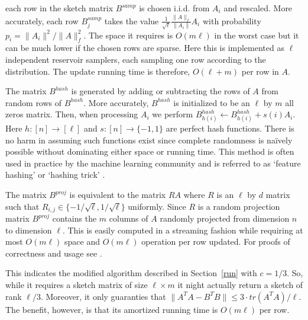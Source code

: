 \documentclass[]{article}
\newcommand{\FD}{Frequent-Directions}
\begin{document}
 each row in the sketch matrix $B^{samp}$ is chosen i.i.d. from $A_i$ and rescaled.
More accurately, each row $B^{samp}_j$ takes the value $\frac{1}{\sqrt{\ell}}\frac{\|A\|_f}{\|A_i\|}A_i$ with probability $p_i = \|A_i\|^2/\|A\|_f^2$.
The space it requires is $O(m \ell)$ in the worst case but it can be much lower if the chosen rows are sparse.
Here this is implemented as $\ell$ independent reservoir samplers, each sampling one row according to the distribution.
The update running time is therefore, $O(\ell + m)$ per row in $A$.

 The matrix $B^{hash}$ is generated by adding or subtracting the rows of $A$ from random rows of $B^{hash}$.
More accurately, $B^{hash}$ is initialized to be an $\ell$ by $m$ all zeros matrix. 
Then, when processing $A_i$ we perform $B^{hash}_{h(i)} \leftarrow B^{hash}_{h(i)} + s(i)A_i$.
Here $h:[n]\rightarrow [\ell]$ and $s:[n]\rightarrow \{-1,1\}$ are perfect hash functions. 
There is no harm in assuming such functions exist since complete randomness is na\"ively possible without dominating either space or running time.
This method is often used in practice by the machine learning community and is referred to as `feature hashing' or `hashing trick'  \cite{WeinbergerDLSA2009}.

The matrix $B^{proj}$ is equivalent to the matrix $RA$ where $R$ is an $\ell$ by $d$ matrix such that $R_{i,j} \in \{-1/\sqrt{\ell},1/\sqrt{\ell}\}$ uniformly. 
Since $R$ is a random projection matrix \cite{Achlioptas01} $B^{proj}$ contains the $m$ columns of $A$ randomly projected from dimension $n$ to dimension $\ell$. 
This is easily computed in a streaming fashion while requiring at most $O(m \ell)$ space and $O(m \ell)$ operation per row updated.
For proofs of correctness and usage see \cite{PapadimitriouTRV1998}\cite{Vempala2004}\cite{Sarlos06}\cite{tygert07PNAS}.

\noindent {\bf \FD:} This indicates the modified algorithm described in Section~\ref{run} with $c=1/3$. 
So, while it requires a sketch matrix of size $\ell \times m$ it night actually return a sketch of rank $\ell/3$.
Moreover, it only guaranties that $\|A^{T}A - B^{T}B\| \le 3\cdot tr(A^{T}A)/\ell$.
The benefit, however, is that its amortized running time is $O(m\ell)$ per row.
\end{document}
